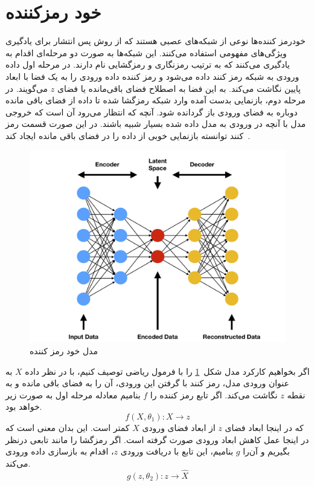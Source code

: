 \documentclass[12pt,a4paper]{report}
\theoremstyle{definition}
\theoremstyle{definition}
\begin{document}
	\section{خود رمزکننده}
	خودرمز کننده‌ها نوعی از شبکه‌های عصبی هستند که از روش پس انتشار برای یادگیری ویژگی‌های مفهومی استفاده می‌کنند. این شبکه‌ها به صورت دو مرحله‌ای اقدام به یادگیری می‌کنند که به ترتیب رمزنگاری و رمزگشایی نام دارند. در مرحله اول داده ورودی به شبکه رمز کنند داده می‌شود و رمز کننده داده ورودی را به یک فضا با ابعاد پایین نگاشت می‌کند. به این فضا به اصطلاح فضای باقی‌مانده یا فضای $z$ می‌گویند. در مرحله دوم، بازنمایی بدست آمده وارد شبکه رمزگشا شده تا داده از فضای باقی مانده دوباره به فضای ورودی باز گردانده شود. آنچه که انتظار می‌رود آن است که خروجی مدل با آنچه در ورودی به مدل داده شده بسیار شبیه باشند. در این صورت قسمت رمز کنند توانسته بازنمایی خوبی از داده را در فضای باقی مانده ایجاد کند~\cite{BHUVANESHWARI2021131}.
\begin{figure}[!h]
	\begin{center}
		\includegraphics[width=0.6\linewidth]{./images/figures/ae.png}
	\end{center}
	\caption{مدل خود رمز کننده}
	\label{fig:ae}
	\centering
\end{figure}

اگر بخواهیم کارکرد مدل شکل~\ref{fig:ae} را با فرمول ریاضی توصیف کنیم، با در نظر داده $X$ به عنوان ورودی مدل، رمز کنند با گرفتن این ورودی، آن را به فضای باقی مانده و به نقطه $z$ نگاشت می‌کند. اگر تابع رمز کننده را $f$ بنامیم معادله مرحله اول به صورت زیر خواهد بود.
\begin{equation}
f(X, \theta_1): X \rightarrow z
\end{equation}
که در اینجا ابعاد فضای $z$ از ابعاد فضای ورودی $X$ کمتر است. این بدان معنی است که در اینجا عمل کاهش ابعاد ورودی صورت گرفته است. اگر رمزگشا را مانند تابعی درنظر بگیریم و آن‌را $g$ بنامیم، این تابع با دریافت ورودی $z$، اقدام به بازسازی داده ورودی می‌کند.
\begin{equation}
	g(z, \theta_2): z \rightarrow \hat{X}
\end{equation}
\end{document}
